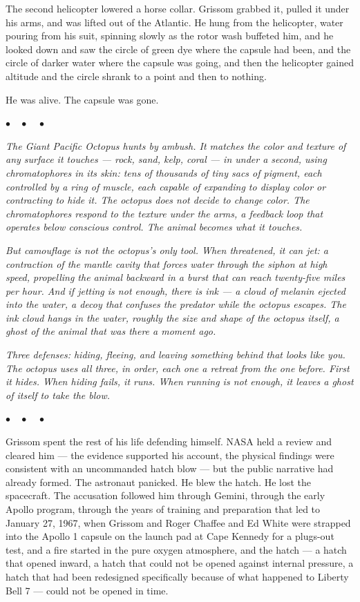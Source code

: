 \documentclass[12pt, letterpaper]{article}
\begin{document}
The second helicopter lowered a horse collar. Grissom grabbed it, pulled it under his arms, and was lifted out of the Atlantic. He hung from the helicopter, water pouring from his suit, spinning slowly as the rotor wash buffeted him, and he looked down and saw the circle of green dye where the capsule had been, and the circle of darker water where the capsule was going, and then the helicopter gained altitude and the circle shrank to a point and then to nothing.

He was alive. The capsule was gone.

\begin{center}
$\bullet\quad\bullet\quad\bullet$
\end{center}

\emph{The Giant Pacific Octopus hunts by ambush. It matches the color and texture of any surface it touches --- rock, sand, kelp, coral --- in under a second, using chromatophores in its skin: tens of thousands of tiny sacs of pigment, each controlled by a ring of muscle, each capable of expanding to display color or contracting to hide it. The octopus does not decide to change color. The chromatophores respond to the texture under the arms, a feedback loop that operates below conscious control. The animal becomes what it touches.}

\emph{But camouflage is not the octopus's only tool. When threatened, it can jet: a contraction of the mantle cavity that forces water through the siphon at high speed, propelling the animal backward in a burst that can reach twenty-five miles per hour. And if jetting is not enough, there is ink --- a cloud of melanin ejected into the water, a decoy that confuses the predator while the octopus escapes. The ink cloud hangs in the water, roughly the size and shape of the octopus itself, a ghost of the animal that was there a moment ago.}

\emph{Three defenses: hiding, fleeing, and leaving something behind that looks like you. The octopus uses all three, in order, each one a retreat from the one before. First it hides. When hiding fails, it runs. When running is not enough, it leaves a ghost of itself to take the blow.}

\begin{center}
$\bullet\quad\bullet\quad\bullet$
\end{center}

Grissom spent the rest of his life defending himself. NASA held a review and cleared him --- the evidence supported his account, the physical findings were consistent with an uncommanded hatch blow --- but the public narrative had already formed. The astronaut panicked. He blew the hatch. He lost the spacecraft. The accusation followed him through Gemini, through the early Apollo program, through the years of training and preparation that led to January 27, 1967, when Grissom and Roger Chaffee and Ed White were strapped into the Apollo 1 capsule on the launch pad at Cape Kennedy for a plugs-out test, and a fire started in the pure oxygen atmosphere, and the hatch --- a hatch that opened inward, a hatch that could not be opened against internal pressure, a hatch that had been redesigned specifically because of what happened to Liberty Bell 7 --- could not be opened in time.
\end{document}
